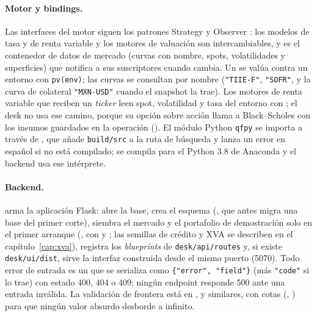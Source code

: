 \begin{sloppypar}
\paragraph{Motor y bindings.} Las interfaces del motor siguen los patrones Strategy y Observer
\citep{gamma1995}: los modelos de tasa y de renta variable y los motores de valuación son intercambiables, y
 es el contenedor de datos de mercado
(curvas con nombre, spots, volatilidades y superficies) que notifica a sus suscriptores
 cuando cambia. Un
 se valúa contra un entorno con
\texttt{pv(env)}; las curvas se consultan por nombre (\texttt{"TIIE-F"}, \texttt{"SOFR"}, y la curva de
colateral \texttt{"MXN-USD"} cuando el snapshot la trae). Los motores de renta variable que reciben un
\emph{ticker} leen spot, volatilidad y tasa del entorno con
; el desk no usa ese camino,
porque su opción sobre acción llama a Black--Scholes con los insumos guardados en la operación
(). El módulo Python \texttt{qfpy} se importa a través de
, que añade \texttt{build/src} a la ruta de búsqueda y lanza un error en
español si no está compilado; se compila para el Python 3.8 de Anaconda y el backend usa ese intérprete.

\paragraph{Backend.}  arma la aplicación Flask: abre la base, crea el
esquema (, que antes migra una base del primer corte), siembra el mercado
y el portafolio de demostración solo en el primer arranque (, con
 y ; las semillas de
crédito y XVA se describen en el capítulo~\ref{cap:xva}), registra los \emph{blueprints} de
\texttt{desk/api/routes} y, si existe \texttt{desk/ui/dist}, sirve la interfaz construida desde el mismo
puerto (5070). Todo error de entrada es un  que se serializa como
\texttt{\{"error", "field"\}} (más \texttt{"code"} si lo trae) con estado 400, 404 o 409; ningún endpoint
responde 500 ante una entrada inválida. La validación de frontera está en
,  y similares, con cotas
(, ) para que ningún
valor absurdo desborde a infinito.


\end{sloppypar}
